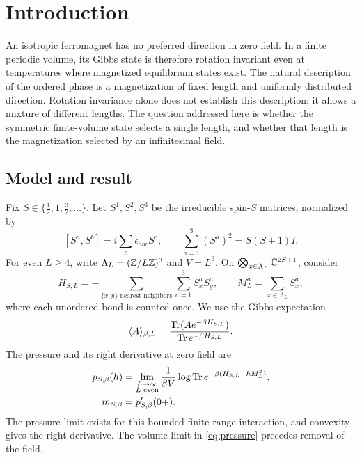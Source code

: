 \section{Introduction}\label{sec:introduction}

An isotropic ferromagnet has no preferred direction in zero field.
In a finite periodic volume, its Gibbs state is therefore rotation
invariant even at temperatures where magnetized equilibrium states exist.
The natural description of the ordered phase is a magnetization of fixed
length and uniformly distributed direction. Rotation invariance alone
does not establish this description: it allows a mixture of different
lengths. The question addressed here is whether the symmetric finite-volume
state selects a single length, and whether that length is the
magnetization selected by an infinitesimal field.

\subsection{Model and result}
Fix $S\in\{\tfrac12,1,\tfrac32,\ldots\}$. Let $S^1,S^2,S^3$ be the
irreducible spin-$S$ matrices, normalized by
\[
 [S^a,S^b]=i\sum_c\epsilon_{abc}S^c,
 \qquad \sum_{a=1}^3(S^a)^2=S(S+1)I.
\]
For even $L\ge4$, write $\Lambda_L=(\mathbb Z/L\mathbb Z)^3$ and $V=L^3$. On
$\bigotimes_{x\in\Lambda_L}\mathbb C^{2S+1}$, consider
\begin{equation}\label{eq:model}
 H_{S,L}=-\sum_{\{x,y\}\text{ nearest neighbors}}
              \sum_{a=1}^3 S_x^aS_y^a,
 \qquad M_L^a=\sum_{x\in\Lambda_L}S_x^a,
\end{equation}
where each unordered bond is counted once. We use the Gibbs expectation
\[
 \langle A\rangle_{\beta,L}
 =\frac{\operatorname{Tr}(Ae^{-\beta H_{S,L}})}{\operatorname{Tr} e^{-\beta H_{S,L}}}.
\]
The pressure and its right derivative at zero field are
\begin{align}
 p_{S,\beta}(h)
   &=\lim_{\substack{L\to\infty\\L\text{ even}}}
       \frac1{\beta V}\log\operatorname{Tr}
          e^{-\beta(H_{S,L}-hM_L^3)},\label{eq:pressure}\\
 m_{S,\beta}&=p_{S,\beta}'(0+).
       \label{eq:magnetization}
\end{align}
The pressure limit exists for this bounded finite-range interaction, and
convexity gives the right derivative. The volume limit in
\eqref{eq:pressure} precedes removal of the field.

